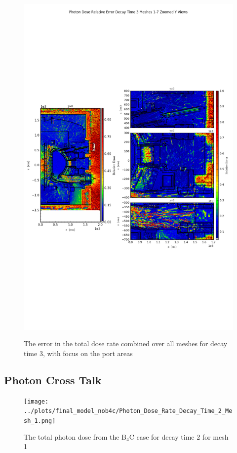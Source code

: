 \documentclass[12pt]{article}
\begin{document}
\begin{figure}[ht!]
\centering
\includegraphics[trim={0cm 9cm 0cm 10cm},clip,scale=0.75]{../plots/final_model/Photon_Dose_Relative_Error_Decay_Time_3_Meshes_1-7_Zoomed_Y_Views.png}
\label{fig:photons_dc3_no4bc_total_error_zoomed}
\caption{The error in the total dose rate combined over all meshes for decay time 3, with focus on the port areas}
\end{figure}
\clearpage
\subsection{Photon Cross Talk}
\begin{figure}[ht!]
\centering
\texttt{[image: ../plots/final\_model\_nob4c/Photon\_Dose\_Rate\_Decay\_Time\_2\_Mesh\_1.png]}
\label{fig:photons_dc2_no4bc_m1_flux}
\caption{The total photon dose from the B$_4$C case for decay time 2 for mesh 1}
\end{figure}
\end{document}
